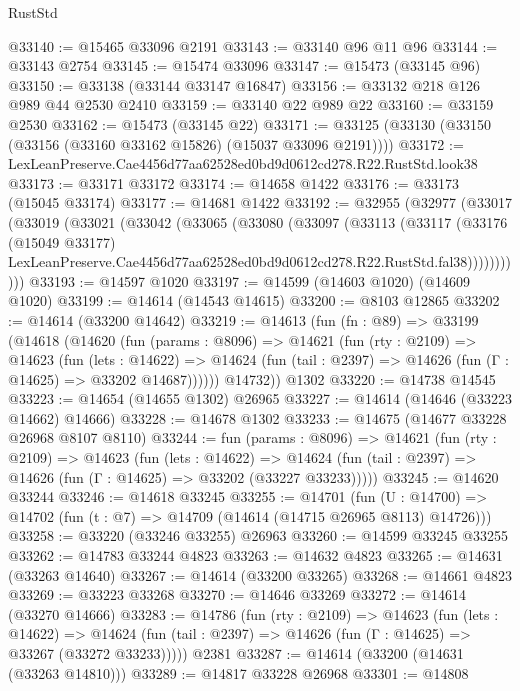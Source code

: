 \begin{lexlean}{RustStd}
\begin{coremodule}
@33140 := @15465 @33096 @2191
@33143 := @33140 @96 @11 @96
@33144 := @33143 @2754
@33145 := @15474 @33096
@33147 := @15473 (@33145 @96)
@33150 := @33138 (@33144 @33147 @16847)
@33156 := @33132 @218 @126 @989 @44 @2530 @2410
@33159 := @33140 @22 @989 @22
@33160 := @33159 @2530
@33162 := @15473 (@33145 @22)
@33171 := @33125 (@33130 (@33150 (@33156 (@33160 @33162 @15826) (@15037 @33096 @2191))))
@33172 := LexLeanPreserve.Cae4456d77aa62528ed0bd9d0612cd278.R22.RustStd.look38
@33173 := @33171 @33172
@33174 := @14658 @1422
@33176 := @33173 (@15045 @33174)
@33177 := @14681 @1422
@33192 := @32955
    (@32977
      (@33017
        (@33019
          (@33021
            (@33042
              (@33065
                (@33080
                  (@33097
                    (@33113
                      (@33117
                        (@33176
                          (@15049 @33177)
                          LexLeanPreserve.Cae4456d77aa62528ed0bd9d0612cd278.R22.RustStd.fal38)))))))))))
@33193 := @14597 @1020
@33197 := @14599 (@14603 @1020) (@14609 @1020)
@33199 := @14614 (@14543 @14615)
@33200 := @8103 @12865
@33202 := @14614 (@33200 @14642)
@33219 := @14613
    (fun (fn : @89) =>
    @33199
      (@14618
        (@14620
          (fun (params : @8096) =>
          @14621
            (fun (rty : @2109) =>
            @14623
              (fun (lets : @14622) =>
              @14624 (fun (tail : @2397) => @14626 (fun (Γ : @14625) => @33202 @14687))))))
        @14732))
    @1302
@33220 := @14738 @14545
@33223 := @14654 (@14655 @1302) @26965
@33227 := @14614 (@14646 (@33223 @14662) @14666)
@33228 := @14678 @1302
@33233 := @14675 (@14677 @33228 @26968 @8107 @8110)
@33244 := fun (params : @8096) =>
  @14621
    (fun (rty : @2109) =>
    @14623
      (fun (lets : @14622) =>
      @14624 (fun (tail : @2397) => @14626 (fun (Γ : @14625) => @33202 (@33227 @33233)))))
@33245 := @14620 @33244
@33246 := @14618 @33245
@33255 := @14701
    (fun (U : @14700) => @14702 (fun (t : @7) => @14709 (@14614 (@14715 @26965 @8113) @14726)))
@33258 := @33220 (@33246 @33255) @26963
@33260 := @14599 @33245 @33255
@33262 := @14783 @33244 @4823
@33263 := @14632 @4823
@33265 := @14631 (@33263 @14640)
@33267 := @14614 (@33200 @33265)
@33268 := @14661 @4823
@33269 := @33223 @33268
@33270 := @14646 @33269
@33272 := @14614 (@33270 @14666)
@33283 := @14786
    (fun (rty : @2109) =>
    @14623
      (fun (lets : @14622) =>
      @14624 (fun (tail : @2397) => @14626 (fun (Γ : @14625) => @33267 (@33272 @33233)))))
    @2381
@33287 := @14614 (@33200 (@14631 (@33263 @14810)))
@33289 := @14817 @33228 @26968
@33301 := @14808

\end{coremodule}
\end{lexlean}

